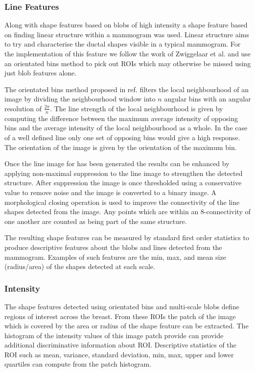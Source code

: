 \subsubsection{Line Features}
Along with shape features based on blobs of high intensity a shape feature based on finding linear structure within a mammogram was used. Linear structure aims to try and characterise the ductal shapes visible in a typical mammogram. For the implementation of this feature we follow the work of Zwiggelaar et al. \cite{zwiggelaar1996finding} and use an orientated bins method to pick out ROIs which may otherwise be missed using just blob features alone.

The orientated bins method proposed in ref. \cite{zwiggelaar1996finding} filters the local neighbourhood of an image by dividing the neighbourhood window into $n$ angular bins with an angular resolution of $\frac{2 \pi}{n}$. The line strength of the local neighbourhood is given by computing the difference between the maximum average intensity of opposing bins and the average intensity of the local neighbourhood as a whole. In the case of a well defined line only one set of opposing bins would give a high response. The orientation of the image is given by the orientation of the maximum bin.

Once the line image for has been generated the results can be enhanced by applying non-maximal suppression \cite{sonka2014image} to the line image to strengthen the detected structure. After suppression the image is once thresholded using a conservative value to remove noise and the image is converted to a binary image. A morphological closing operation is used to improve the connectivity of the line shapes detected from the image. Any points which are within an 8-connectivity of one another are counted as being part of the same structure.

The resulting shape features can be measured by standard first order statistics to produce descriptive features about the blobs and lines detected from the mammogram. Examples of such features are the min, max, and mean size (radius/area) of the shapes detected at each scale.

\subsubsection{Intensity}
The shape features detected using orientated bins and multi-scale blobs define regions of interest across the breast. From these ROIs the patch of the image which is covered by the area or radius of the shape feature can be extracted. The histogram of the intensity values of this image patch provide can provide additional discriminative information about ROI. Descriptive statistics of the ROI such as mean, variance, standard deviation, min, max, upper and lower quartiles can compute from the patch histogram.

